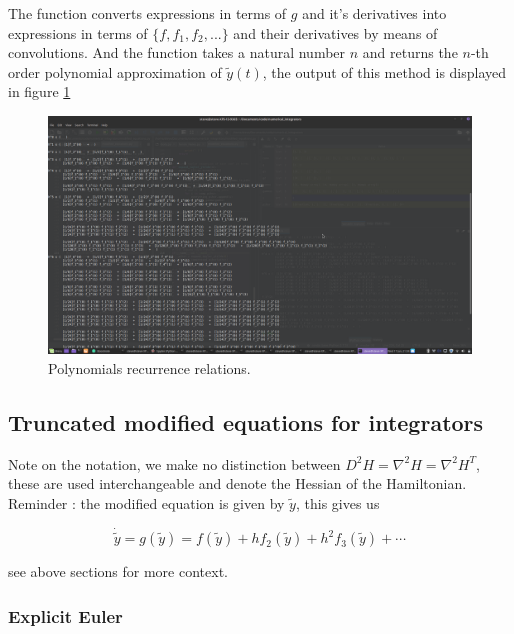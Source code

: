 \documentclass[12pt]{article}
\begin{document}
The function  converts expressions in terms of $g$ and it's derivatives into expressions in terms of $\{f,f_1,f_2,...\}$ and their derivatives by means of convolutions. And the function  takes a natural number $n$ and returns the $n$-th order polynomial approximation of $\widetilde y(t)$, the output of this method is displayed in figure \ref{fig:polynomial recurrence relations}\\

\begin{figure}[H]
    \centering
    \includegraphics[width=0.9\linewidth]{Figures/truncated polynomial coefficients.png}
    \caption{Polynomials recurrence relations.}
    \label{fig:polynomial recurrence relations}
\end{figure}

\subsection{Truncated modified equations for integrators}
\label{section:truncated modified equations}
Note on the notation, we make no distinction between $D^2H = \nabla^2H = \nabla^2H^T$, these are used interchangeable and denote the Hessian of the Hamiltonian. Reminder : the modified equation is given by $\widetilde y$, this gives us

$$\dot{\widetilde y} = g(\widetilde y) = f(\widetilde y) + hf_2(\widetilde y) + h^2f_3(\widetilde y) + \cdots$$

see above sections for more context.

\subsubsection{Explicit Euler}
\end{document}
